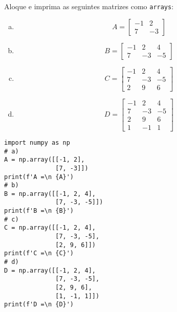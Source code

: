 \begin{exer}
  Aloque e imprima as seguintes matrizes como \lstinline+arrays+:
  \begin{enumerate}[a)]
  \item
    \begin{equation}
      A =
      \begin{bmatrix}
        -1 & 2\\
        7 & -3
      \end{bmatrix}
    \end{equation}
  \item
    \begin{equation}
      B =
      \begin{bmatrix}
        -1 & 2 & 4\\
        7 & -3 & -5 
      \end{bmatrix}
    \end{equation}
  \item
    \begin{equation}
      C =
      \begin{bmatrix}
        -1 & 2 & 4\\
        7 & -3 & -5\\
        2 & 9 & 6
      \end{bmatrix}
    \end{equation}
  \item
    \begin{equation}
      D =
      \begin{bmatrix}
        -1 & 2 & 4\\
        7 & -3 & -5\\
        2 & 9 & 6\\
        1 & -1 & 1
      \end{bmatrix}
    \end{equation}
  \end{enumerate}
\end{exer}
\begin{resp}

\begin{lstlisting}
import numpy as np
# a)
A = np.array([[-1, 2],
              [7, -3]])
print(f'A =\n {A}')
# b)
B = np.array([[-1, 2, 4],
              [7, -3, -5]])
print(f'B =\n {B}')
# c)
C = np.array([[-1, 2, 4],
              [7, -3, -5],
              [2, 9, 6]])
print(f'C =\n {C}')
# d)
D = np.array([[-1, 2, 4],
              [7, -3, -5],
              [2, 9, 6],
              [1, -1, 1]])
print(f'D =\n {D}')
\end{lstlisting}

\end{resp}

